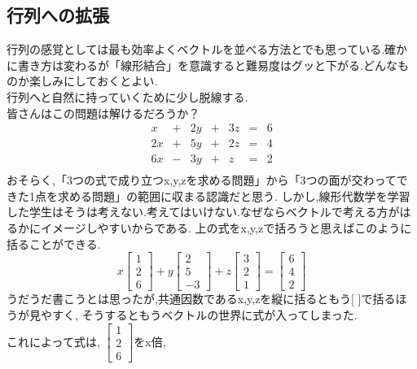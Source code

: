\subsection{行列への拡張}
行列の感覚としては最も効率よくベクトルを並べる方法とでも思っている.確かに書き方は変わるが「線形結合」を意識すると難易度はグッと下がる.どんなものか楽しみにしておくとよい.\\
行列へと自然に持っていくために少し脱線する.\\
皆さんはこの問題は解けるだろうか？\\
\[
\begin{array}{ccccccc}
    x & + &2y & +&3z &= &6 \\
   2x & +&5y & +&2z &= &4 \\
   6x & - &3y & +&z &= &2 \\
\end{array}
\]
おそらく,「3つの式で成り立つx,y,zを求める問題」から「3つの面が交わってできた1点を求める問題」の範囲に収まる認識だと思う.
しかし,線形代数学を学習した学生はそうは考えない.考えてはいけない.なぜならベクトルで考える方がはるかにイメージしやすいからである.
上の式をx,y,zで括ろうと思えばこのように括ることができる.\\
\begin{equation}\label{eq:linear_comb}
x
\begin{bmatrix} 1 \\ 2 \\ 6 \end{bmatrix}
+y
\begin{bmatrix} 2 \\ 5 \\ -3 \end{bmatrix}
+z
\begin{bmatrix} 3 \\ 2 \\ 1 \end{bmatrix}
=
\begin{bmatrix} 6 \\ 4 \\ 2 \end{bmatrix}
\end{equation}
うだうだ書こうとは思ったが,共通因数であるx,y,zを縦に括るともう[ \quad ]で括るほうが見やすく,
そうするともうベクトルの世界に式が入ってしまった.\\
これによって式は,
$\begin{bmatrix} 1 \\ 2 \\ 6 \end{bmatrix}$をx倍,
